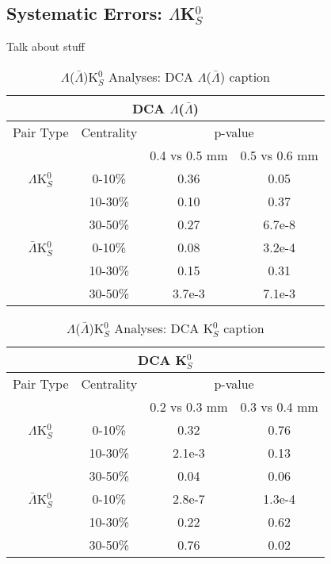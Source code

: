 \documentclass[../AnalysisNoteJBuxton.tex]{subfiles}
\begin{document}
\subsection{Systematic Errors: \texorpdfstring{$\Lambda$K$^{0}_{S}$}{TEXT}}
\label{SysErrsLamK0}

Talk about stuff

\begin{table}
 \centering
 \begin{tabular}{|c|c|c|c|}
  \multicolumn{4}{c}{DCA $\Lambda$($\bar{\Lambda}$)} \\
  \hline
  Pair Type & Centrality & \multicolumn{2}{c|}{p-value} \\
  \cline{3-4}
   & & 0.4 vs 0.5 mm & 0.5 vs 0.6 mm \\
  \hline
  $\Lambda$K$^{0}_{S}$ & 0-10\% & 0.36 & 0.05 \\
   & 10-30\% & 0.10 & 0.37 \\
   & 30-50\% & 0.27 & 6.7e-8 \\
  \hline
  $\bar{\Lambda}$K$^{0}_{S}$ & 0-10\% & 0.08 & 3.2e-4 \\
   & 10-30\% & 0.15 & 0.31 \\
   & 30-50\% & 3.7e-3 & 7.1e-3 \\
  \hline
 \end{tabular}
 \caption{$\Lambda$($\bar{\Lambda}$)K$^{0}_{S}$ Analyses: DCA $\Lambda$($\bar{\Lambda}$) caption}
 \label{tab:LamDcaLamK0}
\end{table}

\begin{table}
 \centering
 \begin{tabular}{|c|c|c|c|}
  \multicolumn{4}{c}{DCA K$^{0}_{S}$} \\
  \hline
  Pair Type & Centrality & \multicolumn{2}{c|}{p-value} \\
  \cline{3-4}
   & & 0.2 vs 0.3 mm & 0.3 vs 0.4 mm \\
  \hline
  $\Lambda$K$^{0}_{S}$ & 0-10\% & 0.32 & 0.76 \\
   & 10-30\% & 2.1e-3 & 0.13 \\
   & 30-50\% & 0.04 & 0.06 \\
  \hline
  $\bar{\Lambda}$K$^{0}_{S}$ & 0-10\% & 2.8e-7 & 1.3e-4 \\
   & 10-30\% & 0.22 & 0.62 \\
   & 30-50\% & 0.76 & 0.02 \\
  \hline
 \end{tabular}
 \caption{$\Lambda$($\bar{\Lambda}$)K$^{0}_{S}$ Analyses: DCA K$^{0}_{S}$ caption}
 \label{tab:K0DcaLamK0}
\end{table}
\end{document}
